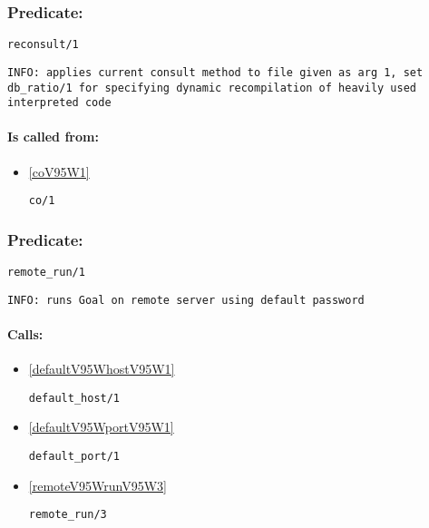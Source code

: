 \subsubsection{Predicate:} \label{reconsultV95W1}

\begin{verbatim}
reconsult/1
\end{verbatim}

{\small \begin{verbatim}
INFO: applies current consult method to file given as arg 1, set db_ratio/1 for specifying dynamic recompilation of heavily used interpreted code

\end{verbatim}}
\paragraph{Is called from:} 
\begin{itemize}
\item \ref{coV95W1} 
\begin{verbatim}
co/1
\end{verbatim}

\end{itemize}

\subsubsection{Predicate:} \label{remoteV95WrunV95W1}

\begin{verbatim}
remote_run/1
\end{verbatim}

{\small \begin{verbatim}
INFO: runs Goal on remote server using default password

\end{verbatim}}
\paragraph{Calls:} 
\begin{itemize}
\item \ref{defaultV95WhostV95W1} 
\begin{verbatim}
default_host/1
\end{verbatim}

\item \ref{defaultV95WportV95W1} 
\begin{verbatim}
default_port/1
\end{verbatim}

\item \ref{remoteV95WrunV95W3} 
\begin{verbatim}
remote_run/3
\end{verbatim}

\end{itemize}

